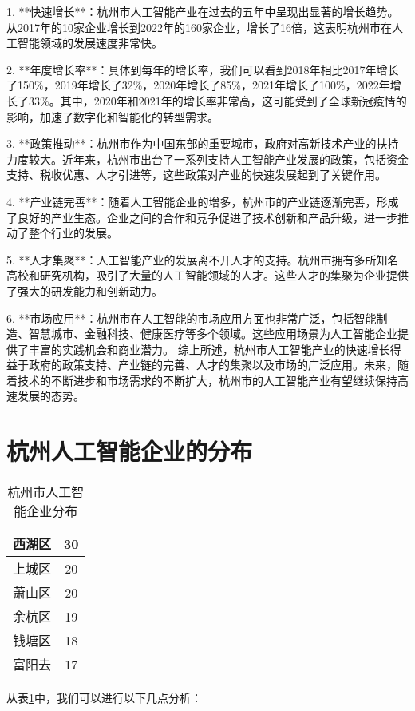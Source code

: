 \documentclass[UTF8,twocolumn]{ctexart}
\begin{document}
1. **快速增长**：杭州市人工智能产业在过去的五年中呈现出显著的增长趋势。从2017年的10家企业增长到2022年的160家企业，增长了16倍，这表明杭州市在人工智能领域的发展速度非常快。

2. **年度增长率**：具体到每年的增长率，我们可以看到2018年相比2017年增长了150\%，2019年增长了32\%，2020年增长了85\%，2021年增长了100\%，2022年增长了33\%。其中，2020年和2021年的增长率非常高，这可能受到了全球新冠疫情的影响，加速了数字化和智能化的转型需求。

3. **政策推动**：杭州市作为中国东部的重要城市，政府对高新技术产业的扶持力度较大。近年来，杭州市出台了一系列支持人工智能产业发展的政策，包括资金支持、税收优惠、人才引进等，这些政策对产业的快速发展起到了关键作用。

4. **产业链完善**：随着人工智能企业的增多，杭州市的产业链逐渐完善，形成了良好的产业生态。企业之间的合作和竞争促进了技术创新和产品升级，进一步推动了整个行业的发展。

5. **人才集聚**：人工智能产业的发展离不开人才的支持。杭州市拥有多所知名高校和研究机构，吸引了大量的人工智能领域的人才。这些人才的集聚为企业提供了强大的研发能力和创新动力。

6. **市场应用**：杭州市在人工智能的市场应用方面也非常广泛，包括智能制造、智慧城市、金融科技、健康医疗等多个领域。这些应用场景为人工智能企业提供了丰富的实践机会和商业潜力。
综上所述，杭州市人工智能产业的快速增长得益于政府的政策支持、产业链的完善、人才的集聚以及市场的广泛应用。未来，随着技术的不断进步和市场需求的不断扩大，杭州市的人工智能产业有望继续保持高速发展的态势。

\section{杭州人工智能企业的分布}
\begin{table}[htbp]
  \centering
    \begin{tabular}{c | c}
      \toprule
      西湖区 & 30\\
      \midrule
      上城区 & 20\\
      \midrule
      萧山区 & 20\\
      \midrule
      余杭区 & 19\\
      \midrule
      钱塘区 & 18\\
      \midrule
      富阳去 & 17\\
      \bottomrule
    \end{tabular}
    \caption{杭州市人工智能企业分布}
    \label{tab:mytable2}
\end{table}
从表\ref{tab:mytable2}中，我们可以进行以下几点分析：
\end{document}
